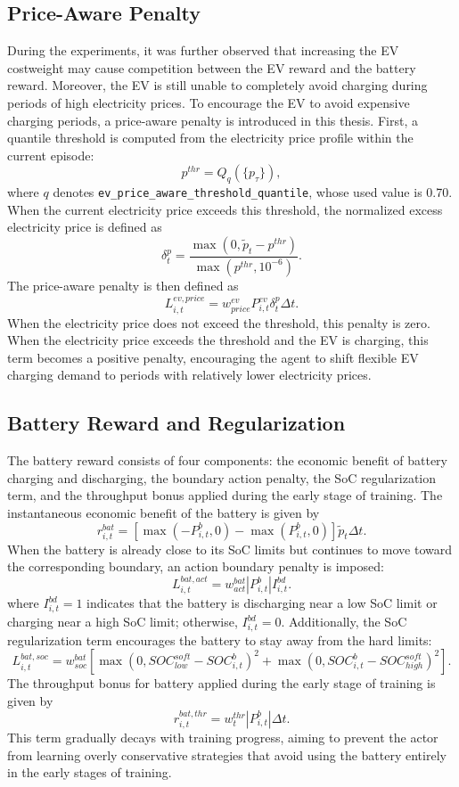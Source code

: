 \subsection{Price-Aware Penalty}

During the experiments, it was further observed that increasing the EV costweight may cause competition between the EV reward and the battery reward. Moreover, the EV is still unable to completely avoid charging during periods of high electricity prices. To encourage the EV to avoid expensive charging periods, a price-aware penalty is introduced in this thesis. First, a quantile threshold is computed from the electricity price profile within the current episode:
\[
  p^{thr}=Q_q(\{p_{\tau}\}),
\]
where \(q\) denotes \texttt{ev\_price\_aware\_threshold\_quantile}, whose used value is 0.70. When the current electricity price exceeds this threshold, the normalized excess electricity price is defined as
\[
  \delta^p_t
  =
  \frac{\max(0,\tilde p_t-p^{thr})}{\max(p^{thr},10^{-6})}.
\]
The price-aware penalty is then defined as
\[
  L^{ev,price}_{i,t}
  =
  w^{ev}_{price}P^{ev}_{i,t}\delta^p_t\Delta t.
\]
When the electricity price does not exceed the threshold, this penalty is zero. When the electricity price exceeds the threshold and the EV is charging, this term becomes a positive penalty, encouraging the agent to shift flexible EV charging demand to periods with relatively lower electricity prices.

\subsection{Battery Reward and Regularization}

The battery reward consists of four components: the economic benefit of battery charging and discharging, the boundary action penalty, the SoC regularization term, and the throughput bonus applied during the early stage of training. The instantaneous economic benefit of the battery is given by
\[
  r^{bat}_{i,t}
  =
  [\max(-P^b_{i,t},0)-\max(P^b_{i,t},0)]
  \tilde p_t\Delta t.
\]
When the battery is already close to its SoC limits but continues to move toward the corresponding boundary, an action boundary penalty is imposed:
\[
  L^{bat,act}_{i,t}
  =
  w^{bat}_{act}|P^b_{i,t}|I^{bd}_{i,t}.
\]
where \(I^{bd}_{i,t}=1\) indicates that the battery is discharging near a low SoC limit or charging near a high SoC limit; otherwise, \(I^{bd}_{i,t}=0\). Additionally, the SoC regularization term encourages the battery to stay away from the hard limits:
\[
  L^{bat,soc}_{i,t}
  =
  w^{bat}_{soc}
  [
  \max(0,SOC^{soft}_{low}-SOC^b_{i,t})^2
  +
  \max(0,SOC^b_{i,t}-SOC^{soft}_{high})^2
  ].
\]
The throughput bonus for battery applied during the early stage of training is given by
\[
  r^{bat,thr}_{i,t}
  =
  w^{thr}_t |P^b_{i,t}|\Delta t.
\]
This term gradually decays with training progress, aiming to prevent the actor from learning overly conservative strategies that avoid using the battery entirely in the early stages of training.

